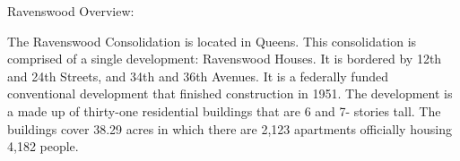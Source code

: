 Ravenswood Overview:       

     

The Ravenswood Consolidation is located in Queens. This consolidation is comprised of a single development: Ravenswood Houses. It is bordered by 12th and 24th Streets, and 34th and 36th Avenues. It is a federally funded conventional development that finished construction in 1951. The development is a made up of thirty-one residential buildings that are 6 and 7- stories tall. The buildings cover 38.29 acres in which there are 2,123 apartments officially housing 4,182 people.